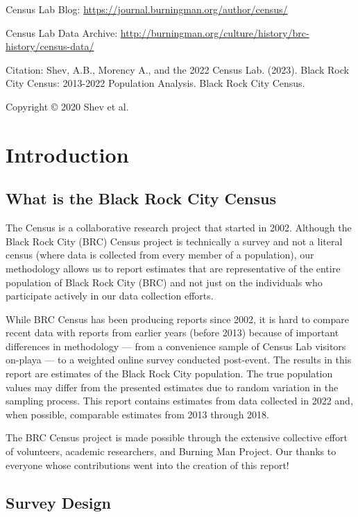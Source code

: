 \documentclass[
]{book}
\begin{document}
Census Lab Blog: \url{https://journal.burningman.org/author/census/}

Census Lab Data Archive: \url{http://burningman.org/culture/history/brc-history/census-data/}

Citation: Shev, A.B., Morency A., and the 2022 Census Lab. (2023). Black Rock City Census: 2013-2022 Population Analysis. Black Rock City Census.

Copyright © 2020 Shev et al.~

\hypertarget{introduction}{%
\chapter{Introduction}\label{introduction}}

\hypertarget{what-is-the-black-rock-city-census}{%
\section{What is the Black Rock City Census}\label{what-is-the-black-rock-city-census}}

The Census is a collaborative research project that started in 2002. Although
the Black Rock City (BRC) Census project is technically a survey and not a
literal census (where data is collected from every member of a population),
our methodology allows us to report estimates that are representative of the
entire population of Black Rock City (BRC) and not just on the individuals who
participate actively in our data collection efforts.

While BRC Census has been producing reports since 2002, it is hard to compare
recent data with reports from earlier years (before 2013) because of important
differences in methodology --- from a convenience sample of Census Lab
visitors on-playa --- to a weighted online survey conducted post-event.
The results in this report are estimates of the Black Rock City population.
The true population values may differ from the presented estimates due to random
variation in the sampling process. This report contains estimates from data
collected in 2022 and, when possible, comparable estimates from 2013 through
2018.

The BRC Census project is made possible through the extensive collective effort
of volunteers, academic researchers, and Burning Man Project. Our thanks to
everyone whose contributions went into the creation of this report!

\hypertarget{survey-design}{%
\section{Survey Design}\label{survey-design}}
\end{document}
